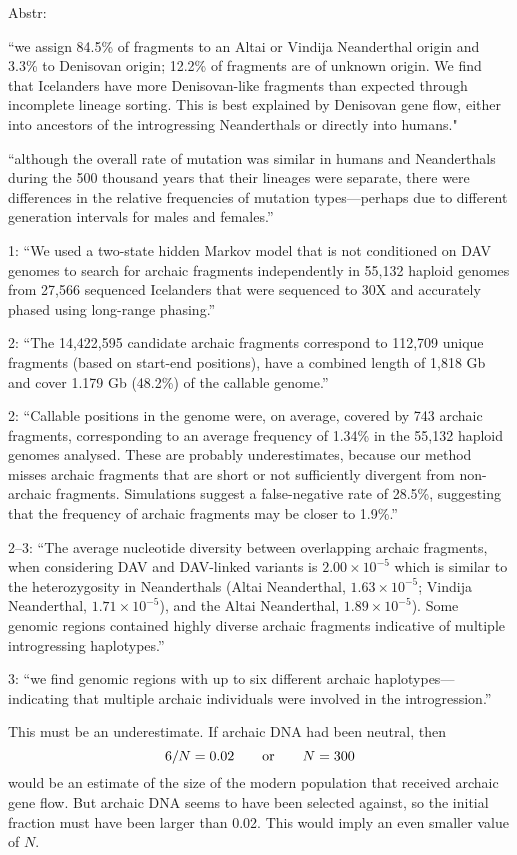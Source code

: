 \documentclass{article}
\begin{document}
Abstr:

``we assign 84.5\% of fragments to an Altai or Vindija Neanderthal
origin and 3.3\% to Denisovan origin; 12.2\% of fragments are of
unknown origin. We find that Icelanders have more Denisovan-like
fragments than expected through incomplete lineage sorting. This is
best explained by Denisovan gene flow, either into ancestors of the
introgressing Neanderthals or directly into humans."

``although the overall rate of mutation was similar in humans and
Neanderthals during the 500 thousand years that their lineages were
separate, there were differences in the relative frequencies of
mutation types---perhaps due to different generation intervals for
males and females.''

1: ``We used a two-state hidden Markov model that is not conditioned
on DAV genomes to search for archaic fragments independently in 55,132
haploid genomes from 27,566 sequenced Icelanders that were sequenced
to 30X and accurately phased using long-range phasing.''

2: ``The 14,422,595 candidate archaic fragments correspond to 112,709
unique fragments (based on start-end positions), have a combined
length of 1,818 Gb and cover 1.179 Gb (48.2\%) of the callable
genome.''

2: ``Callable positions in the genome were, on average, covered by 743
archaic fragments, corresponding to an average frequency of 1.34\% in
the 55,132 haploid genomes analysed. These are probably
underestimates, because our method misses archaic fragments that are
short or not sufficiently divergent from non-archaic
fragments. Simulations suggest a false-negative rate of 28.5\%,
suggesting that the frequency of archaic fragments may be closer to
1.9\%.''

2--3: ``The average nucleotide diversity between overlapping archaic
fragments, when considering DAV and DAV-linked variants is $2.00
\times 10^{-5}$ which is similar to the heterozygosity in Neanderthals
(Altai Neanderthal, $1.63 \times 10^{-5}$; Vindija Neanderthal, $1.71
\times 10^{-5}$), and the Altai Neanderthal, $1.89\times 10^{-5}$).
Some genomic regions contained highly diverse archaic fragments
indicative of multiple introgressing haplotypes.''

3: ``we find genomic regions with up to six different archaic
haplotypes---indicating that multiple archaic individuals were
involved in the introgression.''

This must be an underestimate. If archaic DNA had been neutral, then
\[
6/N = 0.02 \qquad\hbox{or}\qquad N = 300
\]
would be an estimate of the size of the modern population that
received archaic gene flow. But archaic DNA seems to have been
selected against, so the initial fraction must have been larger than
0.02. This would imply an even smaller value of $N$.
\end{document}
